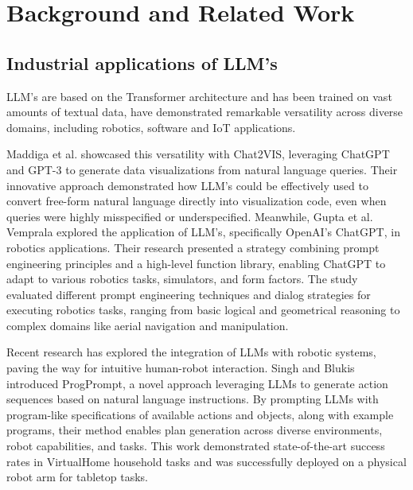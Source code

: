 \documentclass{ieeeaccess}
\begin{document}
\section{Background and Related Work}\label{sec:background}

\subsection{Industrial applications of LLM's}
LLM's are based on the Transformer architecture \cite{DBLP:journals/corr/VaswaniSPUJGKP17} and has been trained on vast amounts of textual data, have demonstrated remarkable versatility across diverse domains, including robotics, software and IoT applications. 

Maddiga et al. \cite{10121440} showcased this versatility with Chat2VIS, leveraging ChatGPT and GPT-3 to generate data visualizations from natural language queries. Their innovative approach demonstrated how LLM's could be effectively used to convert free-form natural language directly into visualization code, even when queries were highly misspecified or underspecified. Meanwhile, Gupta et al. Vemprala \cite{10500490} explored the application of LLM's, specifically OpenAI's ChatGPT, in robotics applications. Their research presented a strategy combining prompt engineering principles and a high-level function library, enabling ChatGPT to adapt to various robotics tasks, simulators, and form factors. The study evaluated different prompt engineering techniques and dialog strategies for executing robotics tasks, ranging from basic logical and geometrical reasoning to complex domains like aerial navigation and manipulation.

Recent research has explored the integration of LLMs with robotic systems, paving the way for intuitive human-robot interaction. Singh and Blukis \cite{Singh2023} introduced ProgPrompt, a novel approach leveraging LLMs to generate action sequences based on natural language instructions. By prompting LLMs with program-like specifications of available actions and objects, along with example programs, their method enables plan generation across diverse environments, robot capabilities, and tasks. This work demonstrated state-of-the-art success rates in VirtualHome household tasks and was successfully deployed on a physical robot arm for tabletop tasks.
\end{document}

